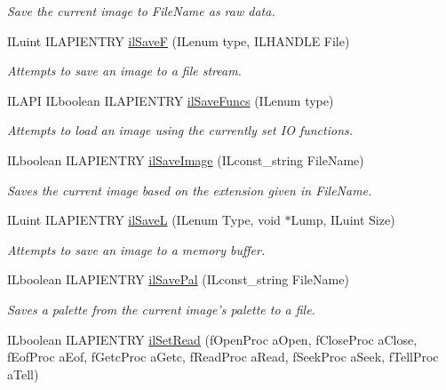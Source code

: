 \begin{DoxyCompactItemize}
\begin{DoxyCompactList}\small\item\em Save the current image to File\+Name as raw data. \end{DoxyCompactList}\item 
I\+Luint I\+L\+A\+P\+I\+E\+N\+T\+R\+Y \hyperlink{group__file_gae870510f45025e0ad59f4a40dcc49b86}{il\+Save\+F} (I\+Lenum type, I\+L\+H\+A\+N\+D\+L\+E File)
\begin{DoxyCompactList}\small\item\em Attempts to save an image to a file stream. \end{DoxyCompactList}\item 
I\+L\+A\+P\+I I\+Lboolean I\+L\+A\+P\+I\+E\+N\+T\+R\+Y \hyperlink{group__file_ga24f497da87676458f3913f7d2a4c0e85}{il\+Save\+Funcs} (I\+Lenum type)
\begin{DoxyCompactList}\small\item\em Attempts to load an image using the currently set I\+O functions. \end{DoxyCompactList}\item 
I\+Lboolean I\+L\+A\+P\+I\+E\+N\+T\+R\+Y \hyperlink{group__file_ga0e9284b1c258d2e8ae123eb3e330723b}{il\+Save\+Image} (I\+Lconst\+\_\+string File\+Name)
\begin{DoxyCompactList}\small\item\em Saves the current image based on the extension given in File\+Name. \end{DoxyCompactList}\item 
I\+Luint I\+L\+A\+P\+I\+E\+N\+T\+R\+Y \hyperlink{group__file_gab9b62589aceecd9c5e4b6ebfe326b181}{il\+Save\+L} (I\+Lenum Type, void $\ast$Lump, I\+Luint Size)
\begin{DoxyCompactList}\small\item\em Attempts to save an image to a memory buffer. \end{DoxyCompactList}\item 
\hypertarget{group__file_gafa4316e5d7b9a35bf872e7ddd2a8bb64}{I\+Lboolean I\+L\+A\+P\+I\+E\+N\+T\+R\+Y \hyperlink{group__file_gafa4316e5d7b9a35bf872e7ddd2a8bb64}{il\+Save\+Pal} (I\+Lconst\+\_\+string File\+Name)}\label{group__file_gafa4316e5d7b9a35bf872e7ddd2a8bb64}

\begin{DoxyCompactList}\small\item\em Saves a palette from the current image's palette to a file. \end{DoxyCompactList}\item 
\hypertarget{group__file_ga0da9f7a1b0cb90a147c1aad3f88f1278}{I\+Lboolean I\+L\+A\+P\+I\+E\+N\+T\+R\+Y \hyperlink{group__file_ga0da9f7a1b0cb90a147c1aad3f88f1278}{il\+Set\+Read} (f\+Open\+Proc a\+Open, f\+Close\+Proc a\+Close, f\+Eof\+Proc a\+Eof, f\+Getc\+Proc a\+Getc, f\+Read\+Proc a\+Read, f\+Seek\+Proc a\+Seek, f\+Tell\+Proc a\+Tell)}\label{group__file_ga0da9f7a1b0cb90a147c1aad3f88f1278}


\end{DoxyCompactItemize}
